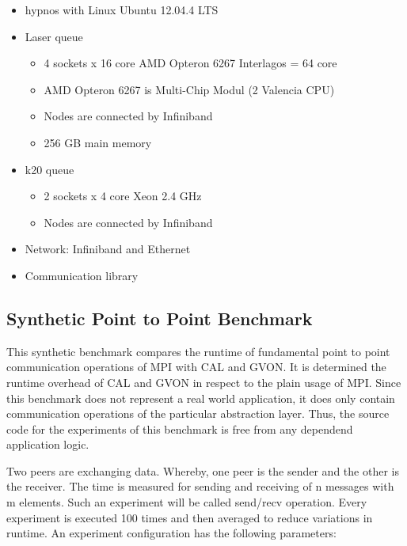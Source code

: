 \begin{itemize}
  \begin{itemize}
  \item hypnos with Linux Ubuntu 12.04.4 LTS
  \item Laser queue
    \begin{itemize}
    \item 4 sockets x 16 core AMD Opteron 6267 Interlagos = 64 core 
    \item AMD Opteron 6267 is Multi-Chip Modul (2 Valencia CPU)
    \item Nodes are connected by Infiniband
    \item 256 GB main memory
    \end{itemize}
  \item k20 queue
    \begin{itemize}
    \item 2 sockets x 4 core Xeon 2.4 GHz
    \item Nodes are connected by Infiniband
    \end{itemize}
  \item Network: Infiniband and Ethernet
  \item Communication library
  \end{itemize}
\end{itemize}

\subsection{Synthetic Point to Point Benchmark}
This synthetic benchmark compares the runtime of fundamental point to
point communication operations of MPI with CAL and GVON. It is
determined the runtime overhead of CAL and GVON in respect to the
plain usage of MPI. Since this benchmark does not represent a real
world application, it does only contain communication operations of
the particular abstraction layer. Thus, the source code for the
experiments of this benchmark is free from any dependend application
logic.

Two peers are exchanging data. Whereby, one peer is the sender and the
other is the receiver. The time is measured for sending and receiving
of n messages with m elements. Such an experiment will be called
send/recv operation. Every experiment is executed 100 times and then
averaged to reduce variations in runtime. An experiment configuration
has the following parameters:

